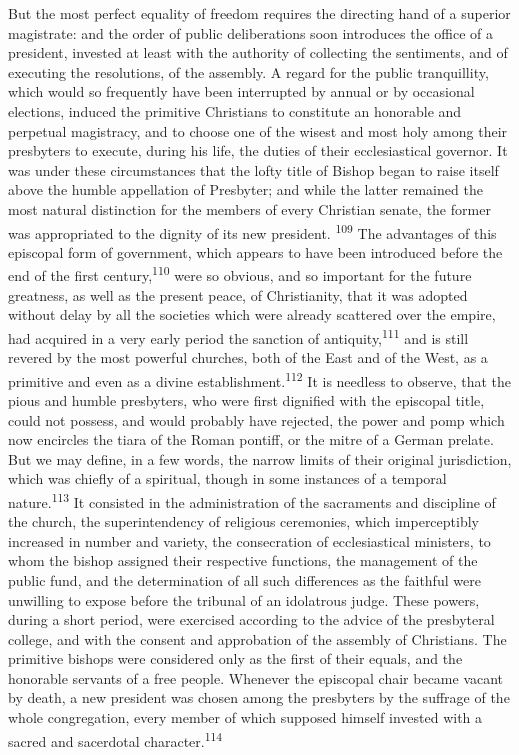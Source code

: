 
But the most perfect equality of freedom requires the directing
hand of a superior magistrate: and the order of public
deliberations soon introduces the office of a president, invested
at least with the authority of collecting the sentiments, and of
executing the resolutions, of the assembly. A regard for the
public tranquillity, which would so frequently have been
interrupted by annual or by occasional elections, induced the
primitive Christians to constitute an honorable and perpetual
magistracy, and to choose one of the wisest and most holy among
their presbyters to execute, during his life, the duties of their
ecclesiastical governor. It was under these circumstances that
the lofty title of Bishop began to raise itself above the humble
appellation of Presbyter; and while the latter remained the most
natural distinction for the members of every Christian senate,
the former was appropriated to the dignity of its new president. \textsuperscript{109}
The advantages of this episcopal form of government, which
appears to have been introduced before the end of the first
century,\textsuperscript{110} were so obvious, and so important for the future
greatness, as well as the present peace, of Christianity, that it
was adopted without delay by all the societies which were already
scattered over the empire, had acquired in a very early period
the sanction of antiquity,\textsuperscript{111} and is still revered by the most
powerful churches, both of the East and of the West, as a
primitive and even as a divine establishment.\textsuperscript{112} It is needless
to observe, that the pious and humble presbyters, who were first
dignified with the episcopal title, could not possess, and would
probably have rejected, the power and pomp which now encircles
the tiara of the Roman pontiff, or the mitre of a German prelate.
But we may define, in a few words, the narrow limits of their
original jurisdiction, which was chiefly of a spiritual, though
in some instances of a temporal nature.\textsuperscript{113} It consisted in the
administration of the sacraments and discipline of the church,
the superintendency of religious ceremonies, which imperceptibly
increased in number and variety, the consecration of
ecclesiastical ministers, to whom the bishop assigned their
respective functions, the management of the public fund, and the
determination of all such differences as the faithful were
unwilling to expose before the tribunal of an idolatrous judge.
These powers, during a short period, were exercised according to
the advice of the presbyteral college, and with the consent and
approbation of the assembly of Christians. The primitive bishops
were considered only as the first of their equals, and the
honorable servants of a free people. Whenever the episcopal chair
became vacant by death, a new president was chosen among the
presbyters by the suffrage of the whole congregation, every
member of which supposed himself invested with a sacred and
sacerdotal character.\textsuperscript{114}

